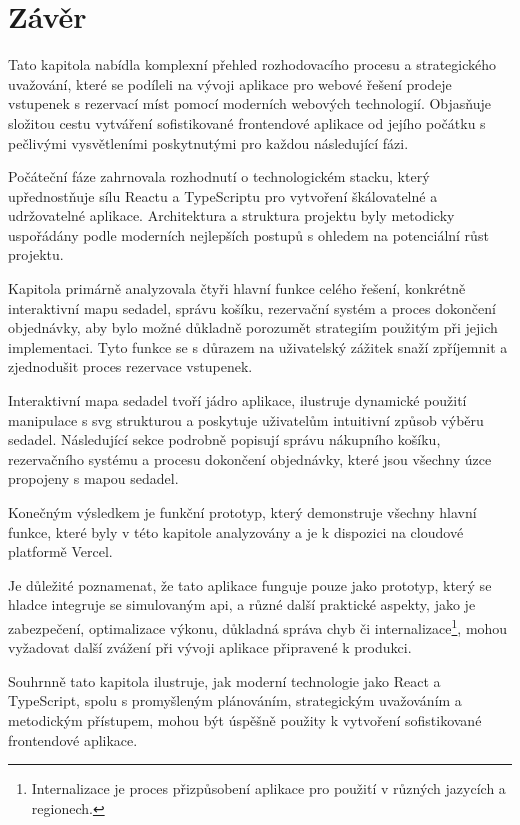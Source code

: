 \section{Závěr}
\label{sec:implementace-zaver}
Tato kapitola nabídla komplexní přehled rozhodovacího procesu a strategického uvažování, které se podíleli na vývoji aplikace pro webové řešení prodeje vstupenek s rezervací míst pomocí moderních webových technologií.
Objasňuje složitou cestu vytváření sofistikované frontendové aplikace od jejího počátku s pečlivými vysvětleními poskytnutými pro každou následující fázi.

Počáteční fáze zahrnovala rozhodnutí o technologickém stacku, který upřednostňuje sílu Reactu a TypeScriptu pro vytvoření škálovatelné a udržovatelné aplikace.
Architektura a struktura projektu byly metodicky uspořádány podle moderních nejlepších postupů s ohledem na potenciální růst projektu.

Kapitola primárně analyzovala čtyři hlavní funkce celého řešení, konkrétně interaktivní mapu sedadel, správu košíku, rezervační systém a proces dokončení objednávky, aby bylo možné důkladně porozumět strategiím použitým při jejich implementaci.
Tyto funkce se s důrazem na uživatelský zážitek snaží zpříjemnit a zjednodušit proces rezervace vstupenek.

Interaktivní mapa sedadel tvoří jádro aplikace, ilustruje dynamické použití manipulace s \ac{svg} strukturou a poskytuje uživatelům intuitivní způsob výběru sedadel.
Následující sekce podrobně popisují správu nákupního košíku, rezervačního systému a procesu dokončení objednávky, které jsou všechny úzce propojeny s mapou sedadel.

Konečným výsledkem je funkční prototyp, který demonstruje všechny hlavní funkce, které byly v této kapitole analyzovány a je k dispozici na cloudové platformě Vercel.

Je důležité poznamenat, že tato aplikace funguje pouze jako prototyp, který se hladce integruje se simulovaným \ac{api}, a různé další praktické aspekty, jako je zabezpečení, optimalizace výkonu, důkladná správa chyb či internalizace\footnote{Internalizace je proces přizpůsobení aplikace pro použití v různých jazycích a regionech.}, mohou vyžadovat další zvážení při vývoji aplikace připravené k produkci.

Souhrnně tato kapitola ilustruje, jak moderní technologie jako React a TypeScript, spolu s promyšleným plánováním, strategickým uvažováním a metodickým přístupem, mohou být úspěšně použity k vytvoření sofistikované frontendové aplikace.

